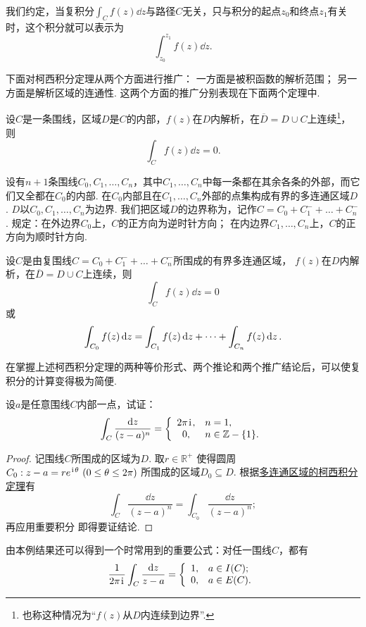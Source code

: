 我们约定，当复积分\(\int_C f(z) \dd{z}\)与路径\(C\)无关，只与积分的起点\(z_0\)和终点\(z_1\)有关时，这个积分就可以表示为\[
\int_{z_0}^{z_1} f(z) \dd{z}.
\]

下面对柯西积分定理从两个方面进行推广：
一方面是被积函数的解析范围；
另一方面是解析区域的连通性.
这两个方面的推广分别表现在下面两个定理中.
\begin{theorem}
设\(C\)是一条围线，区域\(D\)是\(C\)的内部，\(f(z)\)在\(D\)内解析，在\(\overline{D}=D \cup C\)上连续\footnote{%
也称这种情况为“\(f(z)\)从\(D\)内连续到边界”.%
}，则\[
\int_C f(z) \dd{z} = 0.
\]
\end{theorem}

\begin{definition}
设有\(n+1\)条围线\(C_0,C_1,\dots,C_n\)，其中\(C_1,\dots,C_n\)中每一条都在其余各条的外部，而它们又全都在\(C_0\)的内部.
在\(C_0\)内部且在\(C_1,\dots,C_n\)外部的点集构成有界的多连通区域\(D\).
\(D\)以\(C_0,C_1,\dots,C_n\)为边界.
我们把区域\(D\)的边界称为，记作\(C=C_0+C_1^-+\dots+C_n^-\).
规定：在外边界\(C_0\)上，\(C\)的正方向为逆时针方向；
在内边界\(C_1,\dots,C_n\)上，\(C\)的正方向为顺时针方向.
\end{definition}

\begin{theorem}[多连通区域的柯西积分定理]\label{theorem:解析函数的积分表示.多连通区域的柯西积分定理}
设\(C\)是由复围线\(C=C_0+C_1^-+\dots+C_n^-\)所围成的有界多连通区域，
\(f(z)\)在\(D\)内解析，在\(\overline{D}=D \cup C\)上连续，则\[
\int_C f(z) \dd{z} = 0
\]或\begin{equation}
\def\Ic#1{\int_{C_{#1}} f(z) \dd{z}}
\Ic{0} = \Ic{1} + \dots + \Ic{n}.
\end{equation}
\end{theorem}

在掌握上述柯西积分定理的两种等价形式、两个推论和两个推广结论后，可以使复积分的计算变得极为简便.

\begin{example}
设\(a\)是任意围线\(C\)内部一点，试证：\[
\int_C \frac{\dd{z}}{(z-a)^n} = \left\{ \begin{array}{cl}
2\pi\kern1pt\mathrm{i}\kern1pt, & n=1, \\
0, & n\in\mathbb{Z}-\{1\}.
\end{array} \right.
\]
\begin{proof}
记围线\(C\)所围成的区域为\(D\).
取\(r\in\mathbb{R}^+\)
使得圆周\(C_0: z - a = r e^{\kern1pt\mathrm{i}\kern1pt\theta}\ (0 \leq \theta \leq 2\pi)\)
所围成的区域\(D_0 \subseteq D\).
根据\hyperref[theorem:解析函数的积分表示.多连通区域的柯西积分定理]{多连通区域的柯西积分定理}有\[
	\int_C \frac{\dd{z}}{(z-a)^n} = \int_{C_0} \frac{\dd{z}}{(z-a)^n};
\]
再应用重要积分  即得要证结论.
\end{proof}
\end{example}
由本例结果还可以得到一个时常用到的重要公式：对任一围线\(C\)，都有\begin{equation}\label{equation:解析函数的积分表示.重要积分2}
\frac{1}{2\pi\kern1pt\mathrm{i}\kern1pt} \int_C \frac{\dd{z}}{z-a}
= \left\{ \begin{array}{ll}
1, & a \in I(C); \\
0, & a \in E(C).
\end{array} \right.
\end{equation}

